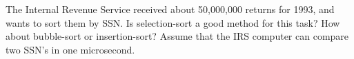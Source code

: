The Internal Revenue Service received about 50,000,000 returns for
1993, and wants to sort them by SSN.  Is selection-sort a good method
for this task?  How about bubble-sort or insertion-sort?  Assume that
the IRS computer can compare two SSN's in one microsecond.
